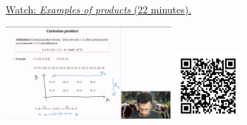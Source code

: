 
\begin{minipage}{10cm}
    \href{https://act4e-spring21.netlify.app/videos/spring2021-products:products:cat-prod:example-prod.html}{Watch: \emph{Examples of products} (22 minutes).}
        
    \href{https://act4e-spring21.netlify.app/videos/spring2021-products:products:cat-prod:example-prod.html}{\includegraphics[height=3.5cm]{spring2021-products:products:cat-prod:example-prod/thumbnails.jpg}}
    \href{https://act4e-spring21.netlify.app/videos/spring2021-products:products:cat-prod:example-prod.html}{\includegraphics[height=2.5cm]{spring2021-products:products:cat-prod:example-prod/qrcode.png}}
\end{minipage}
